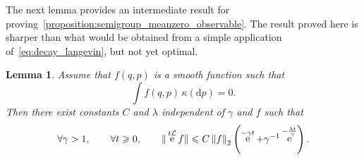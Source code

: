 \documentclass[11pt,a4paper]{article}
\DeclareMathOperator{\e}{e}
\renewcommand{\d}{\mathrm d}
\theoremstyle{plain}
\newtheorem{lemma}{Lemma}[section]
\numberwithin{equation}{section}
\renewcommand{\leq}{\leqslant}
\renewcommand{\geq}{\geqslant}
\begin{document}
The next lemma provides an intermediate result for proving~\cref{proposition:semigroup_meanzero_observable}.
The result proved here is sharper than what would be obtained from a simple application of~\eqref{eq:decay_langevin},
but not yet optimal.
\begin{lemma}
    \label{lemma:initial_lemma}
    Assume that $f(q, p)$ is a smooth function such that
    \begin{equation}
        \label{eq:assumption_f}
        \int f(q, p) \, \kappa(\d p) = 0.
    \end{equation}
    Then there exist constants $C$ and $\lambda$ independent of $\gamma$ and $f$ such that
    \[
        \forall \gamma > 1, \qquad
        \forall t \geq 0, \qquad
        \norm*{\e^{t\mathcal L} f}
        \leq C \norm{f}[2]
        \left( \e^{- \gamma t} + \gamma^{-1} \e^{-\frac{\lambda t}{\gamma}} \right).
    \]
\end{lemma}
\end{document}
